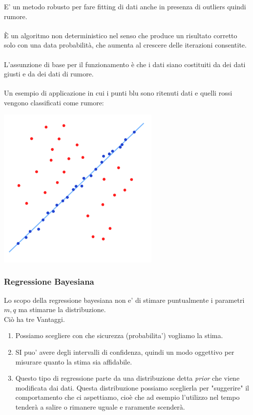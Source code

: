 \documentclass{article}
\begin{document}
E' un metodo robusto per fare fitting di dati anche in presenza di outliers quindi rumore.
\\\\
 È un algoritmo non deterministico nel senso che produce un risultato corretto solo con una data probabilità, che aumenta al crescere delle iterazioni consentite.\\\\
 L'assunzione di base per il funzionamento è che i dati siano costituiti da dei dati giusti e da dei dati di rumore.\\\\
 Un esempio di applicazione in cui i punti blu sono ritenuti dati e quelli rossi vengono classificati come rumore:
\begin{center}
\includegraphics[width=8cm]{RANSAC.png}
\end{center}    

\subsubsection{Regressione Bayesiana}

Lo scopo della regressione bayesiana non e' di stimare puntualmente i parametri \(m, q\) ma stimarne la distribuzione.\\

Ciò ha tre  Vantaggi.\\

\begin{enumerate}
    \item Possiamo scegliere con che sicurezza (probabilita') vogliamo la stima.
    \item SI puo' avere degli intervalli di confidenza, quindi un modo oggettivo per misurare quanto la stima sia affidabile.
    \item Questo tipo di regressione parte da una distribuzione detta \textit{prior} che viene modificata dai dati.
        Questa distribuzione possiamo sceglierla per "suggerire" il comportamento che ci aspettiamo, cioè che ad esempio l'utilizzo nel tempo tenderà a salire o rimanere uguale e raramente scenderà.
    
\end{enumerate}
\end{document}
